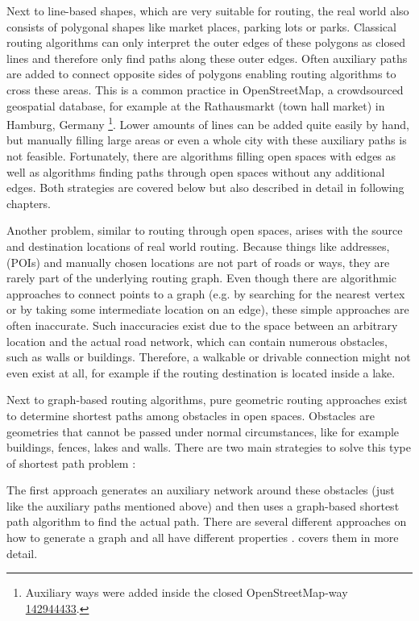 	Next to line-based shapes, which are very suitable for routing, the real world also consists of polygonal shapes like market places, parking lots or parks.
	Classical routing algorithms can only interpret the outer edges of these polygons as closed lines and therefore only find paths along these outer edges.
	Often auxiliary paths are added to connect opposite sides of polygons enabling routing algorithms to cross these areas.
	This is a common practice in OpenStreetMap, a crowdsourced geospatial database, for example at the Rathausmarkt (town hall market) in Hamburg, Germany \footnote{Auxiliary ways were added inside the closed OpenStreetMap-way  \href{https://www.openstreetmap.org/way/142944433}{142944433}.}.
	Lower amounts of lines can be added quite easily by hand, but manually filling large areas or even a whole city with these auxiliary paths is not feasible.
	Fortunately, there are algorithms filling open spaces with edges as well as algorithms finding paths through open spaces without any additional edges.
	Both strategies are covered below but also described in detail in following chapters.
	
	Another problem, similar to routing through open spaces, arises with the source and destination locations of real world routing.
	Because things like addresses,  (POIs) and manually chosen locations are not part of roads or ways, they are rarely part of the underlying routing graph.
	Even though there are algorithmic approaches to connect points to a graph (e.g. by searching for the nearest vertex or by taking some intermediate location on an edge), these simple approaches are often inaccurate.
	Such inaccuracies exist due to the space between an arbitrary location and the actual road network, which can contain numerous obstacles, such as walls or buildings.
	Therefore, a walkable or drivable connection might not even exist at all, for example if the routing destination is located inside a lake.
	
	Next to graph-based routing algorithms, pure geometric routing approaches exist to determine shortest paths among obstacles in open spaces.
	Obstacles are geometries that cannot be passed under normal circumstances, like for example buildings, fences, lakes and walls.
	There are two main strategies to solve this type of shortest path problem \cite{hershberger-suri}:
	
	The first approach generates an auxiliary network around these obstacles (just like the auxiliary paths mentioned above) and then uses a graph-based shortest path algorithm to find the actual path.
	There are several different approaches on how to generate a graph and all have different properties \cite{graser-osm-open-spaces}.
	 covers them in more detail.
	
